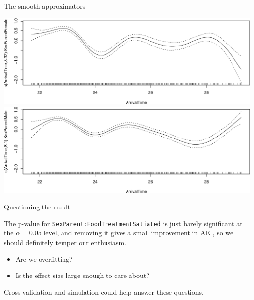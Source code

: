 \documentclass[
  ignorenonframetext,
]{beamer}
\newenvironment{Shaded}{\begin{snugshade}}{\end{snugshade}}
\newcommand{\KeywordTok}[1]{\textcolor[rgb]{0.13,0.29,0.53}{\textbf{#1}}}
\newcommand{\NormalTok}[1]{#1}
\newcommand{\OperatorTok}[1]{\textcolor[rgb]{0.81,0.36,0.00}{\textbf{#1}}}
\providecommand{\tightlist}{%
  \setlength{\itemsep}{0pt}\setlength{\parskip}{0pt}}
\begin{document}
\begin{frame}[fragile]{The smooth approximators}
\protect\hypertarget{the-smooth-approximators}{}

\begin{Shaded}
\end{Shaded}

\includegraphics{mixed_models_files/figure-beamer/unnamed-chunk-34-1.pdf}
\includegraphics{mixed_models_files/figure-beamer/unnamed-chunk-34-2.pdf}

\end{frame}

\begin{frame}[fragile]{Questioning the result}
\protect\hypertarget{questioning-the-result}{}

The p-value for \texttt{SexParent:FoodTreatmentSatiated} is just barely
significant at the \(\alpha=0.05\) level, and removing it gives a small
improvement in AIC, so we should definitely temper our enthusiasm.

\begin{itemize}
\tightlist
\item
  Are we overfitting?
\item
  Is the effect size large enough to care about?
\end{itemize}

Cross validation and simulation could help answer these questions.

\end{frame}
\end{document}
